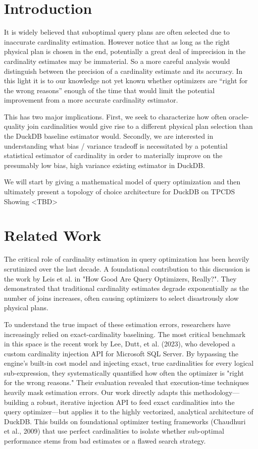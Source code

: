\documentclass[sigconf,nonacm]{acmart}
\begin{document}
\section{Introduction}

It is widely believed that suboptimal query plans are often selected due to inaccurate cardinality estimation. However notice that as long as the right physical plan is chosen in the end, potentially a great deal of imprecision in the cardinality estimates may be immaterial. So a more careful analysis would distinguish between the precision of a cardinality estimate and its accuracy. In this light it is to our knowledge not yet known whether optimizers are “right for the wrong reasons” enough of the time that would limit the potential improvement from a more accurate cardinality estimator.

This has two major implications. First, we seek to characterize how often oracle-quality join cardinalities would give rise to a different physical plan selection than the DuckDB baseline estimator would. Secondly, we are interested in understanding what bias / variance tradeoff is necessitated by a potential statistical estimator of cardinality in order to materially improve on the presumably low bias, high variance existing estimator in DuckDB.

We will start by giving a mathematical model of query optimization and then ultimately present a topology of choice architecture for DuckDB on TPCDS Showing <TBD>

\section{Related Work}

The critical role of cardinality estimation in query optimization has been heavily scrutinized over the last decade. A foundational contribution to this discussion is the work by Leis et al. in "How Good Are Query Optimizers, Really?". They demonstrated that traditional cardinality estimates degrade exponentially as the number of joins increases, often causing optimizers to select disastrously slow physical plans.

To understand the true impact of these estimation errors, researchers have increasingly relied on exact-cardinality baselining. The most critical benchmark in this space is the recent work by Lee, Dutt, et al. (2023), who developed a custom cardinality injection API for Microsoft SQL Server. By bypassing the engine’s built-in cost model and injecting exact, true cardinalities for every logical sub-expression, they systematically quantified how often the optimizer is "right for the wrong reasons." Their evaluation revealed that execution-time techniques heavily mask estimation errors. Our work directly adapts this methodology—building a robust, iterative injection API to feed exact cardinalities into the query optimizer—but applies it to the highly vectorized, analytical architecture of DuckDB. This builds on foundational optimizer testing frameworks (Chaudhuri et al., 2009) that use perfect cardinalities to isolate whether sub-optimal performance stems from bad estimates or a flawed search strategy.
\end{document}
